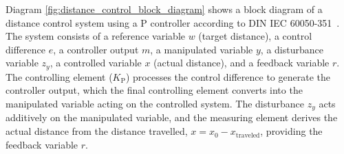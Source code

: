 \documentclass[12pt, oneside, a4paper]{scrreprt}
\begin{document}
            Diagram \ref{fig:distance_control_block_diagram} shows a block diagram of a distance control system using a P controller according to DIN IEC 60050-351~\cite{DIN_IEC_60050-351_2014}. The system consists of a reference variable $w$ (target distance), a control difference $e$, a controller output $m$, a manipulated variable $y$, a disturbance variable $z_y$, a controlled variable $x$ (actual distance), and a feedback variable $r$. The controlling element ($K_\mathrm{P}$) processes the control difference to generate the controller output, which the final controlling element converts into the manipulated variable acting on the controlled system. The disturbance $z_y$ acts additively on the manipulated variable, and the measuring element derives the actual distance from the distance travelled, $x = x_0 - x_\mathrm{traveled}$, providing the feedback variable $r$.
\end{document}
